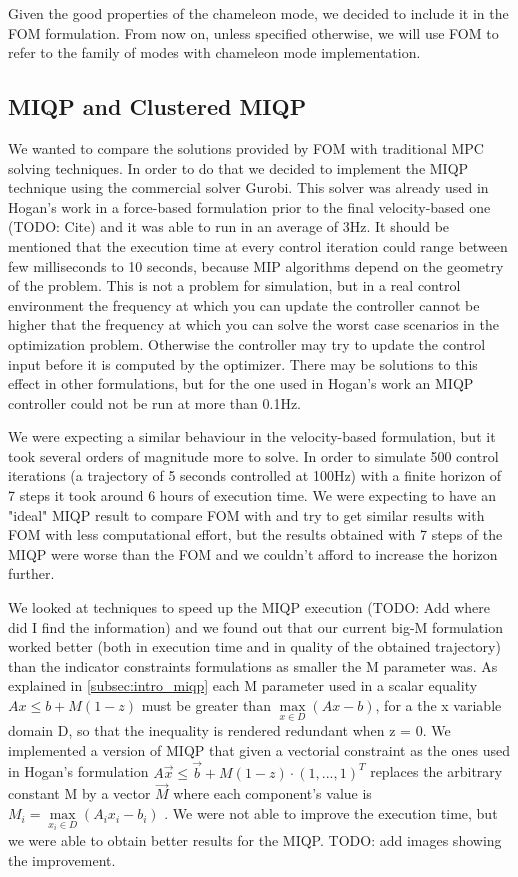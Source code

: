 \documentclass[12,twoside]{TFG-GM}
\theoremstyle{definition}
\theoremstyle{remark}
\begin{document}
Given the good properties of the chameleon mode, we decided to include it in the FOM formulation. From now on, unless specified otherwise, we will use FOM to refer to the family of modes with chameleon mode implementation.

\subsection{MIQP and Clustered MIQP}
\label{subsec:miqp}

We wanted to compare the solutions provided by FOM with traditional MPC solving techniques. In order to do that we decided to implement the MIQP technique using the commercial solver Gurobi. This solver was already used in Hogan's work in a force-based formulation prior to the final velocity-based one (TODO: Cite) and it was able to run in an average of 3Hz. It should be mentioned that the execution time at every control iteration could range between few milliseconds to 10 seconds, because MIP algorithms depend on the geometry of the problem.
This is not a problem for simulation, but in a real control environment the frequency at which you can update the controller cannot be higher that the frequency at which you can solve the worst case scenarios in the optimization problem. Otherwise the controller may try to update the control input before it is computed by the optimizer. There may be solutions to this effect in other formulations, but for the one used in Hogan's work an MIQP controller could not be run at more than 0.1Hz.

We were expecting a similar behaviour in the velocity-based formulation, but it took several orders of magnitude more to solve. In order to simulate 500 control iterations (a trajectory of 5 seconds controlled at 100Hz) with a finite horizon of 7 steps it took around 6 hours of execution time. We were expecting to have an "ideal" MIQP result to compare FOM with and try to get similar results with FOM with less computational effort, but the results obtained with 7 steps of the MIQP were worse than the FOM and we couldn't afford to increase the horizon further.

We looked at techniques to speed up the MIQP execution (TODO: Add where did I find the information) and we found out that our current big-M formulation worked better (both in execution time and in quality of the obtained trajectory) than the indicator constraints formulations as smaller the M parameter was. As explained in \ref{subsec:intro_miqp} each M parameter used in a scalar equality $Ax \leq b + M (1 - z)$ must be greater than $\max\limits_{x \in D}{(Ax - b)}$, for a the x variable domain D, so that the inequality is rendered redundant when z = 0. We implemented a version of MIQP that given a vectorial constraint as the ones used in Hogan's formulation $A\vec{x} \leq \vec{b} + M (1 - z) \cdot (1, ..., 1)^T$ replaces the arbitrary constant M by a vector $\vec{M}$ where each component's value is $M_i = \max\limits_{x_i \in D}{(A_i x_i - b_i)}$
. We were not able to improve the execution time, but we were able to obtain better results for the MIQP. TODO: add images showing the improvement.
\end{document}

